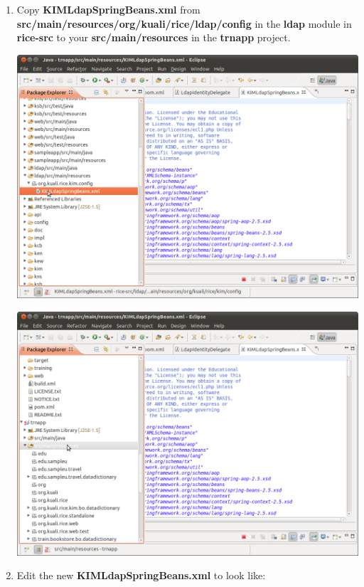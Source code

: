 \begin{enumerate}
\item Copy \textbf{KIMLdapSpringBeans.xml} from
  \textbf{src/main/resources/org/kuali/rice/ldap/config} in the
  \textbf{ldap} module in \textbf{rice-src} to your
  \textbf{src/main/resources} in the \textbf{trnapp} project.

\includegraphics[width=\textwidth]{images/Screenshot19.png}

\includegraphics[width=\textwidth]{images/Screenshot20.png}

\item Edit the new \textbf{KIMLdapSpringBeans.xml} to look like:


\end{enumerate}
